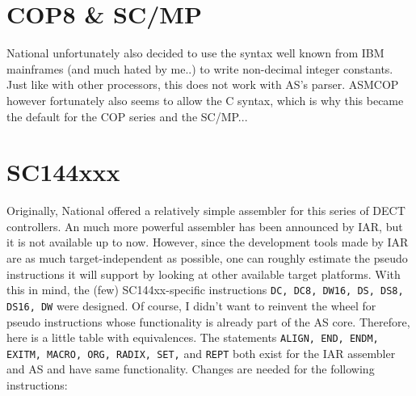 \documentclass[12pt,twoside]{report}
\newcommand{\tty}[1]{{\tt #1}}
\begin{document}

\section{COP8 \& SC/MP}
\label{COP8Spec}

National unfortunately also decided to use the syntax well known from
IBM mainframes (and much hated by me..) to write non-decimal integer
constants.  Just like with other processors, this does not work with
AS's parser.  ASMCOP however fortunately also seems to allow the C
syntax, which is why this became the default for the COP series and
the SC/MP...


\section{SC144xxx}
\label{SC144xxspec}

Originally, National offered a relatively simple assembler for this series
of DECT controllers.  An much more powerful assembler has been announced
by IAR, but it is not available up to now.  However, since the development
tools made by IAR are as much target-independent as possible, one can
roughly estimate the pseudo instructions it will support by looking at
other available target platforms.  With this in mind, the (few)
SC144xx-specific instructions {\tt DC, DC8, DW16, DS, DS8, DS16, DW} were
designed.  Of course, I didn't want to reinvent the wheel for pseudo
instructions whose functionality is already part of the AS core. 
Therefore, here is a little table with equivalences.  The statements
\tty{ALIGN, END, ENDM, EXITM, MACRO, ORG, RADIX, SET,} and \tty{REPT} both
exist for the IAR assembler and AS and have same functionality.  Changes
are needed for the following instructions:
\end{document}
